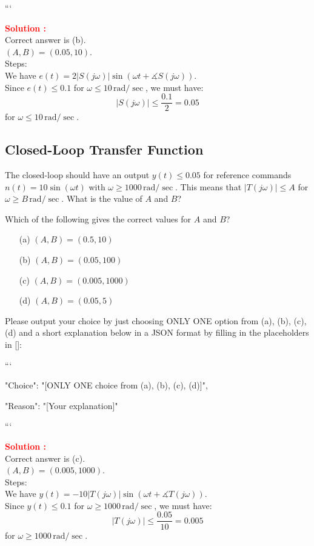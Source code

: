\documentclass[12pt]{article}
\begin{document}
```

\textbf{\textcolor{red}{Solution :}} \\
Correct answer is (b).\\
$(A,B) = (0.05, 10)$. \\
Steps: \\
We have $e(t) = 2 |S(j\omega)| \sin(\omega t + \measuredangle S(j\omega))$. \\
Since $e(t) \le 0.1$ for $\omega \le 10 \,\text{rad}/\sec$, we must have:
$$|S(j\omega)| \le \frac{0.1}{2} = 0.05$$
for $\omega \le 10 \,\text{rad}/\sec$. 
\clearpage

\subsection{Closed-Loop Transfer Function}

The closed-loop should have an output $y(t) \le 0.05$ for reference commands $n(t) = 10 \sin(\omega t)$  with $\omega \ge 1000 \,\text{rad}/\sec$. This means that $|T(j\omega)|\le A$ for $\omega \ge B\,\text{rad}/\sec$. What is the value of $A$ and $B$?

Which of the following gives the correct values for $A$ and $B$?

\begin{itemize}
    \item[(a)] $(A,B)=(0.5, 10)$
    \item[(b)] $(A,B)=(0.05,100)$
    \item[(c)] $(A,B)=(0.005, 1000)$
    \item[(d)] $(A,B)=(0.05, 5)$
\end{itemize}


Please output your choice by just choosing ONLY ONE option from (a), (b), (c), (d) and a short explanation below in a JSON format by filling in the placeholders in []:

```
{

"Choice": "[ONLY ONE choice from (a), (b), (c), (d)]",

"Reason": "[Your explanation]"

}

```

\textbf{\textcolor{red}{Solution :}} \\
Correct answer is (c).\\
$(A,B) = (0.005, 1000)$. \\
Steps: \\
We have $y(t) = -10 |T(j\omega)| \sin(\omega t + \measuredangle T(j\omega))$. \\
Since $y(t) \le 0.1$ for $\omega \ge 1000 \,\text{rad}/\sec$, we must have:
$$|T(j\omega)| \le \frac{0.05}{10} = 0.005$$
for $\omega \ge 1000 \,\text{rad}/\sec$. 
\clearpage
\end{document}
